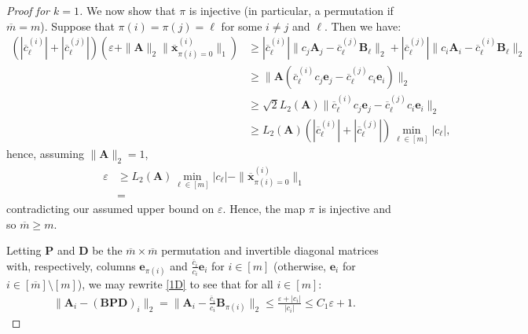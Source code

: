 \documentclass[journal, onecolumn]{IEEEtran}
\begin{document}
\begin{proof}[Proof for $k=1$]
We now show that $\pi$ is injective (in particular, a permutation if $\overline m = m$). Suppose that $\pi(i) = \pi(j) = \ell$ for some $i \neq j$ and $\ell$. Then we have: %
\begin{align*}
(|\overline{c}^{(i)}_\ell| + |\overline{c}^{(j)}_\ell|) \left(\varepsilon + \|\mathbf{A}\|_2 \| \mathbf{\overline x}^{(i)}_{\pi(i)=0} \|_1 \right) 
&\geq |\overline{c}^{(i)}_\ell| \|c_{j}\mathbf{A}_{j} - \overline{c}^{(j)}_\ell\mathbf{B}_{\ell}\|_2  + |\overline{c}^{(j)}_\ell| \|c_{i}\mathbf{A}_{i} - \overline{c}^{(i)}_\ell \mathbf{B}_{\ell}\|_2 \nonumber \\
&\geq \|\mathbf{A}(\overline{c}^{(i)}_\ell c_{j} \mathbf{e}_{j} - \overline{c}^{(j)}_\ell c_{i}\mathbf{e}_{i})\|_2 \nonumber \\ 
&\geq \sqrt{2}  L_2(\mathbf{A}) \|\overline{c}^{(i)}_\ell c_{j} \mathbf{e}_{j} - \overline{c}^{(j)}_\ell c_{i}\mathbf{e}_{i}\|_2 \nonumber \\
&\geq  L_2(\mathbf{A}) (|\overline{c}^{(i)}_\ell| + |\overline{c}^{(j)}_\ell|) \min_{\ell \in [m]} |c_\ell |,
\end{align*}
hence, assuming $\|\mathbf{A}\|_2 = 1$,
\begin{align*}
\varepsilon  &\geq  L_2(\mathbf{A})  \min_{\ell \in [m]} |c_\ell | - \| \mathbf{\overline x}^{(i)}_{\pi(i)=0} \|_1 \\
&=
\end{align*}
contradicting our assumed upper bound on $\varepsilon$. Hence, the map $\pi$ is injective and so $\overline m \geq m$. %

Letting $\mathbf{P}$ and $\mathbf{D}$ be the $\overline m \times \overline m$ permutation and invertible diagonal matrices with, respectively, columns $\mathbf{e}_{\pi(i)}$ and $\frac{\overline{c}_i}{c_i}\mathbf{e}_i$ for $i \in [m]$ (otherwise, $\mathbf{e}_{i}$ for $i \in [\overline{m}] \setminus [m]$), we may rewrite \eqref{1D} to see that for all $i \in [m]$:
\begin{align*}
\|\mathbf{A}_i - (\mathbf{BPD})_i\|_2 
= \|\mathbf{A}_i - \frac{\overline{c}_i}{c_i}\mathbf{B}_{\pi(i)}\|_2 
\leq \frac{\varepsilon + |c_i|}{|c_i|} 
\leq C_1\varepsilon + 1.
\end{align*}
\end{proof}
\end{document}

